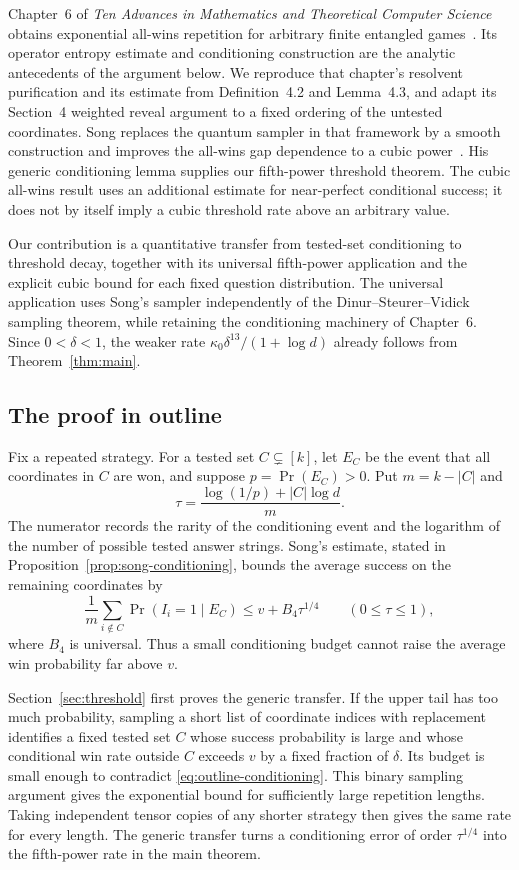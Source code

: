 Chapter~6 of \emph{Ten Advances in Mathematics and Theoretical Computer
Science} obtains exponential all-wins repetition for arbitrary finite
entangled games~\cite{tenadvances2026}. Its operator entropy estimate
and conditioning construction are the analytic antecedents of the
argument below. We reproduce that chapter's resolvent purification and
its estimate from Definition~4.2 and Lemma~4.3, and adapt its
Section~4 weighted reveal argument to a fixed ordering of the untested
coordinates.
Song replaces the quantum sampler in that framework by a smooth
construction and improves the all-wins gap dependence to a cubic
power~\cite{song2026}. His generic conditioning lemma supplies our
fifth-power threshold theorem. The cubic all-wins result uses an
additional estimate for near-perfect conditional success; it does not
by itself imply a cubic threshold rate above an arbitrary value.

Our contribution is a quantitative transfer from tested-set
conditioning to threshold decay, together with its universal
fifth-power application and the explicit cubic bound for each fixed
question distribution. The universal application uses Song's sampler
independently of the Dinur--Steurer--Vidick sampling theorem, while
retaining the conditioning machinery of Chapter~6. Since $0<\delta<1$,
the weaker rate
$\kappa_0\delta^{13}/(1+\log d)$ already follows from
Theorem~\ref{thm:main}.

\subsection{The proof in outline}

Fix a repeated strategy. For a tested set $C\subsetneq[k]$, let $E_C$
be the event that all coordinates in $C$ are won, and suppose
$p=\Pr(E_C)>0$. Put $m=k-|C|$ and
\[
 \tau=\frac{\log(1/p)+|C|\log d}{m}.
\]
The numerator records the rarity of the conditioning event and the
logarithm of the number of possible tested answer strings. Song's
estimate, stated in Proposition~\ref{prop:song-conditioning}, bounds
the average success on the remaining coordinates by
\begin{equation}\label{eq:outline-conditioning}
 \frac1m\sum_{i\notin C}\Pr(I_i=1\mid E_C)
 \le v+B_4\tau^{1/4}\qquad(0\le\tau\le1),
\end{equation}
where $B_4$ is universal. Thus a small conditioning budget cannot raise
the average win probability far above $v$.

Section~\ref{sec:threshold} first proves the generic transfer. If the
upper tail has too much probability,
sampling a short list of coordinate indices with replacement identifies
a fixed tested set $C$ whose success probability is large and whose
conditional win rate outside $C$ exceeds $v$ by a fixed fraction of
$\delta$. Its budget is small enough to contradict
\eqref{eq:outline-conditioning}. This binary sampling argument gives
the exponential bound for sufficiently large repetition lengths. Taking
independent tensor copies of any shorter strategy then gives the same
rate for every length. The generic transfer turns a conditioning error
of order $\tau^{1/4}$ into the fifth-power rate in the main theorem.

